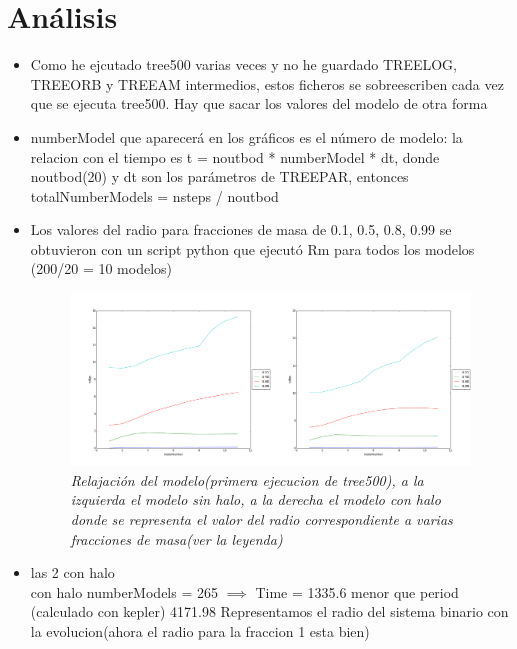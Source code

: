 \documentclass[12pt]{book}
\begin{document}
\section*{Análisis}
\begin{itemize}
\item Como he ejcutado tree500 varias veces y no he guardado TREELOG, TREEORB y TREEAM intermedios, estos ficheros se sobreescriben cada vez que se ejecuta tree500. Hay que sacar los valores del modelo de otra forma
\item numberModel que aparecerá en los gráficos es el número de modelo: la relacion con el tiempo es t = noutbod * numberModel * dt, donde noutbod(20) y dt son los parámetros de TREEPAR, entonces totalNumberModels = nsteps / noutbod
\item Los valores del radio para fracciones de masa de 0.1, 0.5, 0.8, 0.99 se obtuvieron con un script python que ejecutó Rm para todos los modelos (200/20 = 10 modelos)


\begin{figure}[!h]
 \centering
 \includegraphics[scale=0.2]{imgRad1.png}
 \caption{\emph{Relajación del modelo(primera ejecucion de tree500), a la izquierda el modelo sin halo, a la derecha el modelo con halo\\
	donde se representa el valor del radio correspondiente a varias fracciones de masa(ver la leyenda)
}}
 \label{Fig: 1}
\end{figure}

\item las 2 con halo\\
con halo numberModels = 265  $\implies$ Time = 1335.6 menor que period (calculado con kepler) 4171.98
Representamos el radio del sistema binario con la evolucion(ahora el radio para la fraccion 1 esta bien)



\end{itemize}
\end{document}
